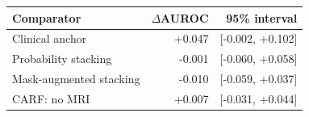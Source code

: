 \begin{tabular}{lrr}
\toprule
Comparator & $\Delta$AUROC & 95\% interval\\
\midrule
Clinical anchor & +0.047 & [-0.002, +0.102]\\
Probability stacking & -0.001 & [-0.060, +0.058]\\
Mask-augmented stacking & -0.010 & [-0.059, +0.037]\\
CARF: no MRI & +0.007 & [-0.031, +0.044]\\
\bottomrule
\end{tabular}
